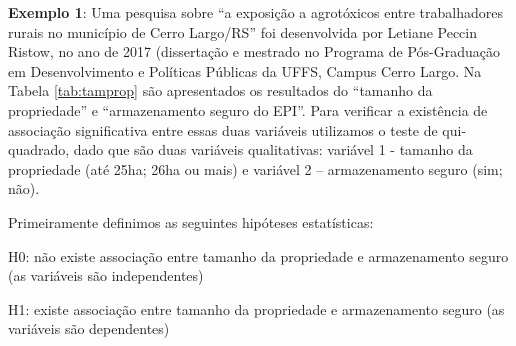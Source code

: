 \documentclass[12pt,portuguese,oneside]{book}
\begin{document}
\textbf{Exemplo 1}: Uma pesquisa sobre ``a exposição a agrotóxicos entre
trabalhadores rurais no município de Cerro Largo/RS'' foi desenvolvida
por Letiane Peccin Ristow, no ano de 2017 (dissertação e mestrado no
Programa de Pós-Graduação em Desenvolvimento e Políticas Públicas da
UFFS, Campus Cerro Largo. Na Tabela \ref{tab:tamprop} são apresentados
os resultados do ``tamanho da propriedade'' e ``armazenamento seguro do
EPI''. Para verificar a existência de associação significativa entre
essas duas variáveis utilizamos o teste de qui-quadrado, dado que são
duas variáveis qualitativas: variável 1 - tamanho da propriedade (até
25ha; 26ha ou mais) e variável 2 -- armazenamento seguro (sim; não).

Primeiramente definimos as seguintes hipóteses estatísticas:

H0: não existe associação entre tamanho da propriedade e armazenamento
seguro (as variáveis são independentes)

H1: existe associação entre tamanho da propriedade e armazenamento
seguro (as variáveis são dependentes)
\end{document}
